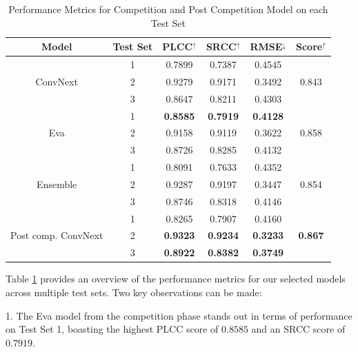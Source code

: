 \documentclass[a4paper,12pt,openright]{book}
\begin{document}
\begin{table}[h]

\label{res_test}
\smallskip
\begin{center}
\begin{tabular}{ | c | c | c | c | c | c | }
\hline  
  \textbf{Model} & \textbf{Test Set} & \textbf{PLCC$^{\uparrow}$} & \textbf{SRCC$^{\uparrow}$} & \textbf{RMSE$^{\downarrow}$} &
  \textbf{Score$^{\uparrow}$}\\ 
\hline  
  \multirow{3}{*}{ConvNext} & 1 & 0.7899 & 0.7387 & 0.4545 & \multirow{3}{*}{0.843} \\
                            & 2 & 0.9279 & 0.9171 & 0.3492 & \\
                            & 3 & 0.8647 & 0.8211 & 0.4303 & \\
\hline
  \multirow{3}{*}{Eva} & 1 & \textbf{0.8585} & \textbf{0.7919} & \textbf{0.4128} & \multirow{3}{*}{0.858}
  \\ & 2 & 0.9158 & 0.9119 & 0.3622 & \\
   & 3 & 0.8726 & 0.8285 & 0.4132 & \\
\hline

  \multirow{3}{*}{Ensemble} & 1 & 0.8091 & 0.7633 & 0.4352 & \multirow{3}{*}{0.854} \\
                            & 2 & 0.9287 &
                            0.9197 & 0.3447  & \\
                            & 3 & 0.8746 & 0.8318& 0.4146 & \\
                            \hline
  \multirow{3}{*}{Post comp. ConvNext} & 1 & 0.8265 & 0.7907 & 0.4160 & \multirow{3}{*}{\textbf{0.867}} \\
                            & 2 & \textbf{0.9323} & \textbf{ 0.9234} & \textbf{0.3233}  & \\
                            & 3 & \textbf{ 0.8922} & \textbf{0.8382} & \textbf{0.3749} & \\
\hline  
\end{tabular}
\end{center}
\caption{Performance Metrics for Competition and Post Competition Model on each Test Set}
\end{table}

Table \ref{res_test} provides an overview of the performance metrics for our selected models across multiple test sets. Two key observations can be made:

1. The Eva model from the competition phase stands out in terms of performance on Test Set 1, boasting the highest PLCC score of \(0.8585\) and an SRCC score of \(0.7919\).
   
\end{document}
